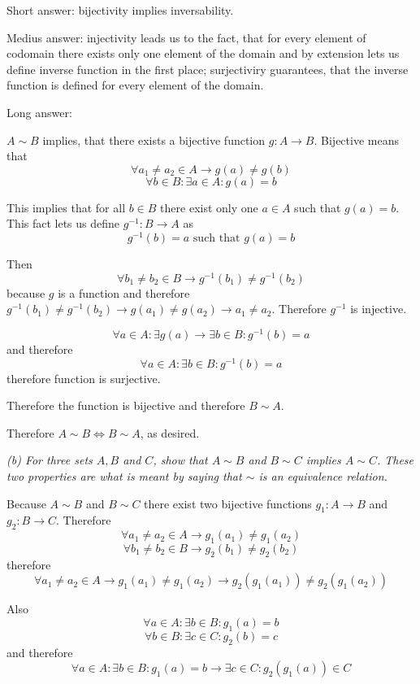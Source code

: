 \documentclass[11pt,oneside,titlepage]{book}
\begin{document}
Short answer: bijectivity implies inversability.

Medius answer: injectivity leads us to the fact, that for every element of codomain there
exists only one element of the domain and by extension lets us
define inverse function in the first place;
surjectiviry guarantees, that the inverse function is defined for every element of the domain.

Long answer:

$A \sim B$ implies, that there exists a bijective function $g: A \to B$. Bijective means
that
$$\forall a_1 \neq a_2 \in A \to g(a) \neq g(b)$$
$$\forall b \in B: \exists a \in A: g(a) = b$$

This implies that for all $b \in B$ there exist only one $a \in A$ such that $g(a) = b$.
This fact lets us define $g^{-1}: B \to A$ as
$$g^{-1}(b) = a \text{ such that } g(a) = b$$

Then
$$\forall b_1 \neq b_2 \in B \to g^{-1}(b_1) \neq g^{-1}(b_2)$$
because $g$ is a function and therefore $g^{-1}(b_1) \neq g^{-1}(b_2) \to
g(a_1) \neq g(a_2) \to a_1 \neq a_2$. Therefore $g^{-1}$ is injective.

$$\forall a \in A: \exists g(a) \to \exists b \in B: g^{-1}(b) = a$$
and therefore
$$\forall a \in A: \exists b \in B: g^{-1}(b) = a$$
therefore function is surjective.

Therefore the function is bijective and therefore $B \sim A$.

Therefore $A \sim B \iff B \sim A $, as desired.


\textit{(b) For three sets $A, B$ and $C$, show that $A \sim B$ and $B \sim C$
  implies $A \sim C$. These two properties are what is meant by saying that $\sim$
  is an equivalence relation.}

Because $A \sim B$ and $B \sim C$ there exist two bijective functions $g_1: A \to B$ and
$g_2: B \to C$.
Therefore
$$\forall a_1 \neq a_2 \in A \to g_1(a_1) \neq g_1(a_2)$$
$$\forall b_1 \neq b_2 \in B \to g_2(b_1) \neq g_2(b_2)$$
therefore
$$\forall a_1 \neq a_2 \in A \to g_1(a_1) \neq g_1(a_2) \to g_2(g_1(a_1)) \neq g_2(g_1(a_2))$$

Also
$$\forall a \in A: \exists b \in B: g_1(a) = b$$
$$\forall b \in B: \exists c \in C: g_2(b) = c$$
and therefore
$$\forall a \in A: \exists b \in B: g_1(a) = b \to  \exists c \in C: g_2(g_1(a)) \in C $$
\end{document}
